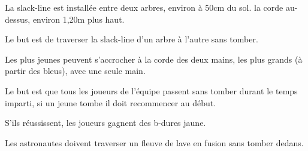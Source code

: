 \documentclass{grand-jeu}
\begin{document}
\begin{liste-materiel}
\end{liste-materiel}

\begin{regles}
La slack-line est installée entre deux arbres, environ à 50cm du sol. la corde au-dessus, environ 1,20m plus haut.

Le but est de traverser la slack-line d'un arbre à l'autre sans tomber. 

Les plus jeunes peuvent s'accrocher à la corde des deux mains, les plus grands (à partir des bleus), avec une seule main. 

Le but est que tous les joueurs de l'équipe passent sans tomber durant le temps imparti, si un jeune tombe il doit recommencer au début.

S’ils réussissent, les joueurs gagnent des b-dures jaune. 
\end{regles}

\begin{imaginaire}
Les astronautes doivent traverser un fleuve de lave en fusion sans tomber dedans. 
\end{imaginaire}

\begin{moments-stop}
\end{moments-stop}
\end{document}

